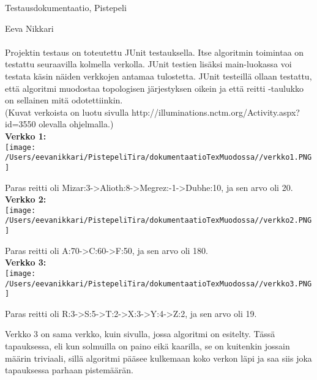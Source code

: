 \documentclass[12pt,a4paper,leqno]{amsart}
\begin{document}
Testausdokumentaatio, Pistepeli

Eeva Nikkari\\\\

Projektin testaus on toteutettu JUnit testauksella. Itse algoritmin toimintaa on testattu seuraavilla kolmella verkolla. JUnit testien lisäksi main-luokassa voi testata käsin näiden verkkojen antamaa tulostetta. JUnit testeillä ollaan testattu, että algoritmi muodostaa topologisen järjestyksen oikein ja että reitti -taulukko on sellainen mitä odotettiinkin.\\
(Kuvat verkoista on luotu sivulla http://illuminations.nctm.org/Activity.aspx?id=3550 olevalla ohjelmalla.)\\

\textbf{Verkko 1:}\\
\texttt{[image: /Users/eevanikkari/PistepeliTira/dokumentaatioTexMuodossa//verkko1.PNG]}

Paras reitti oli Mizar:3->Alioth:8->Megrez:-1->Dubhe:10, ja sen arvo oli 20.\\

\textbf{Verkko 2:}\\
\texttt{[image: /Users/eevanikkari/PistepeliTira/dokumentaatioTexMuodossa//verkko2.PNG]}

Paras reitti oli A:70->C:60->F:50, ja sen arvo oli 180.\\

\textbf{Verkko 3:}\\
\texttt{[image: /Users/eevanikkari/PistepeliTira/dokumentaatioTexMuodossa//verkko3.PNG]}

Paras reitti oli R:3->S:5->T:2->X:3->Y:4->Z:2, ja sen arvo oli 19.



Verkko 3 on sama verkko, kuin sivulla, jossa algoritmi on esitelty. Tässä tapauksessa, eli kun solmuilla on paino eikä kaarilla, se on kuitenkin jossain määrin triviaali, sillä algoritmi pääsee kulkemaan koko verkon läpi ja saa siis joka tapauksessa parhaan pistemäärän.
\\\\
\end{document}
